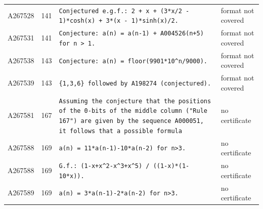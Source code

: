 \documentclass[11pt]{article}
\theoremstyle{definition}
\theoremstyle{remark}
\begin{document}
{\begin{longtable}{p{1.3cm}p{0.7cm}p{10cm}p{3cm}}
A267528 & 141 & \texttt{Conjectured \allowbreak{}e.g.f.: \allowbreak{}2 \allowbreak{}+\allowbreak{} \allowbreak{}x \allowbreak{}+\allowbreak{} \allowbreak{}(3*\allowbreak{}x/\allowbreak{}2 \allowbreak{}-\allowbreak{} \allowbreak{}1)\allowbreak{}*\allowbreak{}cosh(x)\allowbreak{} \allowbreak{}+\allowbreak{} \allowbreak{}3*\allowbreak{}(x \allowbreak{}-\allowbreak{} \allowbreak{}1)\allowbreak{}*\allowbreak{}sinh(x)\allowbreak{}/\allowbreak{}2.} & format not covered \\
A267531 & 141 & \texttt{Conjecture: \allowbreak{}a(n)\allowbreak{} \allowbreak{}=\allowbreak{} \allowbreak{}a(n-\allowbreak{}1)\allowbreak{} \allowbreak{}+\allowbreak{} \allowbreak{}A004526(n+\allowbreak{}5)\allowbreak{} \allowbreak{}for \allowbreak{}n \allowbreak{}> \allowbreak{}1.} & format not covered \\
A267538 & 143 & \texttt{Conjecture: \allowbreak{}a(n)\allowbreak{} \allowbreak{}=\allowbreak{} \allowbreak{}floor(9901*\allowbreak{}10\^{}n/\allowbreak{}9000)\allowbreak{}.} & format not covered \\
A267539 & 143 & \texttt{\{1,\allowbreak{}3,\allowbreak{}6\} \allowbreak{}followed \allowbreak{}by \allowbreak{}A198274 \allowbreak{}(conjectured)\allowbreak{}.} & format not covered \\
A267581 & 167 & \texttt{Assuming \allowbreak{}the \allowbreak{}conjecture \allowbreak{}that \allowbreak{}the \allowbreak{}positions \allowbreak{}of \allowbreak{}the \allowbreak{}0-\allowbreak{}bits \allowbreak{}of \allowbreak{}the \allowbreak{}middle \allowbreak{}column \allowbreak{}("Rule \allowbreak{}167")\allowbreak{} \allowbreak{}are \allowbreak{}given \allowbreak{}by \allowbreak{}the \allowbreak{}sequence \allowbreak{}A000051,\allowbreak{} \allowbreak{}it \allowbreak{}follows \allowbreak{}that \allowbreak{}a \allowbreak{}possible \allowbreak{}formula} & no certificate \\
A267588 & 169 & \texttt{a(n)\allowbreak{} \allowbreak{}=\allowbreak{} \allowbreak{}11*\allowbreak{}a(n-\allowbreak{}1)\allowbreak{}-\allowbreak{}10*\allowbreak{}a(n-\allowbreak{}2)\allowbreak{} \allowbreak{}for \allowbreak{}n>3.} & no certificate \\
A267588 & 169 & \texttt{G.f.: \allowbreak{}(1-\allowbreak{}x+\allowbreak{}x\^{}2-\allowbreak{}x\^{}3+\allowbreak{}x\^{}5)\allowbreak{} \allowbreak{}/\allowbreak{} \allowbreak{}((1-\allowbreak{}x)\allowbreak{}*\allowbreak{}(1-\allowbreak{}10*\allowbreak{}x)\allowbreak{})\allowbreak{}.} & no certificate \\
A267589 & 169 & \texttt{a(n)\allowbreak{} \allowbreak{}=\allowbreak{} \allowbreak{}3*\allowbreak{}a(n-\allowbreak{}1)\allowbreak{}-\allowbreak{}2*\allowbreak{}a(n-\allowbreak{}2)\allowbreak{} \allowbreak{}for \allowbreak{}n>3.} & no certificate \\

\end{longtable}}
\end{document}
